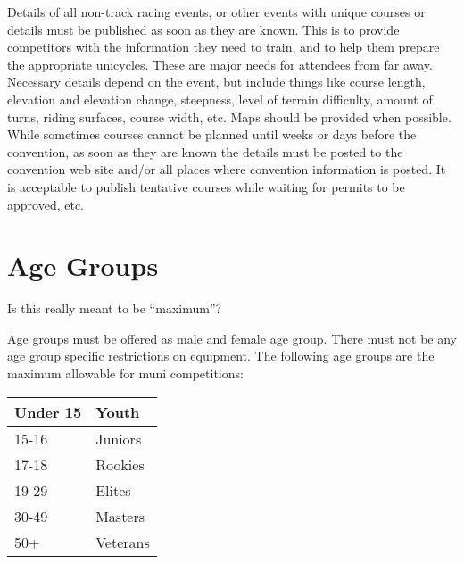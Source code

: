 Details of all non-track racing events, or other events with unique courses or details must be published as soon as they are known.
This is to provide competitors with the information they need to train, and to help them prepare the appropriate unicycles.
These are major needs for attendees from far away.
Necessary details depend on the event, but include things like course length, elevation and elevation change, steepness, level of terrain difficulty, amount of turns, riding surfaces, course width, etc.
Maps should be provided when possible.
While sometimes courses cannot be planned until weeks or days before the convention, as soon as they are known the details must be posted to the convention web site and/or all places where convention information is posted.
It is acceptable to publish tentative courses while waiting for permits to be approved, etc.

\section{Age Groups}

\begin{comment2016}%
Is this really meant to be ``maximum''?
\end{comment2016}

Age groups must be offered as male and female age group.
There must not be any age group specific restrictions on equipment.
The following age groups are the maximum allowable for muni competitions:

\begin{tabular}{|l|l|}
\hline
Under 15 & Youth \\
\hline
15-16 & Juniors \\
\hline
17-18 & Rookies \\
\hline
19-29 & Elites \\
\hline
30-49 & Masters \\
\hline
50+ & Veterans \\
\hline
\end{tabular}

